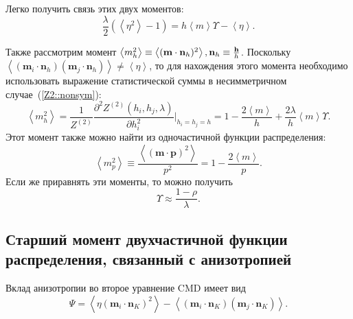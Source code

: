 \documentclass[12pt]{article}
\def\m{\mathbf m{}}
\def\n{\mathbf n{}}
\def\p{\mathbf p{}}
\def\h{{\bf h}}
\def\sr#1{\left<#1\right>}
\def\ZV{Z^{(2)}}
\begin{document}
Легко получить связь этих двух моментов:
\begin{equation}
    \frac{\lambda}{2} \left(\left<\eta^{2}\right> - 1\right) = h \left<m\right> \Upsilon - \left<\eta\right>.
\end{equation}

Также рассмотрим момент $\sr{m_h^2} \equiv \sr{(\m \cdot \n_h)^2}, \n_h \equiv \frac{\h}{h}$. Поскольку $\sr{(\m_i \cdot \n_h)(\m_j \cdot \n_h)} \neq \sr\eta$, то для нахождения этого момента необходимо использовать выражение статистической суммы в несимметричном случае~(\ref{Z2::nonsym}):
\begin{equation}
    \sr{m_h^2} = \frac{1}{\ZV} \frac{\partial^2 \ZV(h_i, h_j, \lambda)}{\partial h_i^2}\Big|_{h_i=h_j=h} = 1 - \frac{2 \left<m\right>}{h} + \frac{2\lambda}{h}\sr m \Upsilon.
\end{equation}
Этот момент также можно найти из одночастичной функции распределения:
\begin{equation}
    \sr{m_p^2} \equiv\frac{\sr{(\m \cdot \p)^2}}{p^2} = 1 - \frac{2 \left<m\right>}{p}.
\end{equation}
Если же приравнять эти моменты, то можно получить
\begin{equation}
    \Upsilon \approx \frac{1-\rho}{\lambda}.
\end{equation} 

\subsection*{Старший момент двухчастичной функции распределения, связанный с анизотропией}
Вклад анизотропии во второе уравнение CMD имеет вид
\begin{equation*}
  \Psi = \sr{\eta (\m_i \cdot \n_K)^2} - \sr{(\m_i \cdot \n_K) (\m_j \cdot \n_K)}.
\end{equation*}
\end{document}
